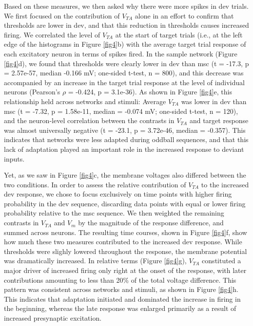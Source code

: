 \documentclass[pdflatex,referee,iicol,sn-basic]{sn-jnl}
\theoremstyle{thmstyleone}%
\theoremstyle{thmstyletwo}%
\theoremstyle{thmstylethree}%
\begin{document}
Based on these measures, we then asked why there were more spikes in dev trials. We first focused on the contribution of $V_{TA}$ alone in an effort to confirm that thresholds are lower in dev, and that this reduction in thresholds causes increased firing. We correlated the level of $V_{TA}$ at the start of target trials (i.e., at the left edge of the histograms in Figure \ref{fig4}b) with the average target trial response of each excitatory neuron in terms of spikes fired. In the sample network (Figure \ref{fig4}d), we found that thresholds were clearly lower in dev than msc (t = -17.3, p = 2.57e-57, median -0.166 mV; one-sided t-test, n = 800), and this decrease was accompanied by an increase in the target trial response at the level of individual neurons (Pearson's $\rho$ = -0.424, p = 3.1e-36). As shown in Figure \ref{fig4}e, this relationship held across networks and stimuli: Average $V_{TA}$ was lower in dev than msc (t = -7.32, p = 1.58e-11, median = -0.074 mV; one-sided t-test, n = 120), and the neuron-level correlation between the contrasts in $V_{TA}$ and target response was almost universally negative (t = -23.1, p = 3.72e-46, median = -0.357). This indicates that networks were less adapted during oddball sequences, and that this lack of adaptation played an important role in the increased response to deviant inputs.

Yet, as we saw in Figure \ref{fig4}c, the membrane voltages also differed between the two conditions. In order to assess the relative contribution of $V_{TA}$ to the increased dev response, we chose to focus exclusively on time points with higher firing probability in the dev sequence, discarding data points with equal or lower firing probability relative to the msc sequence. We then weighted the remaining contrasts in $V_{TA}$ and $V_m$ by the magnitude of the response difference, and summed across neurons. The resulting time courses, shown in Figure \ref{fig4}f, show how much these two measures contributed to the increased dev response. While thresholds were slighly lowered throughout the response, the membrane potential was dramatically increased. In relative terms (Figure \ref{fig4}g), $V_{TA}$ constituted a major driver of increased firing only right at the onset of the response, with later contributions amounting to less than 20\% of the total voltage difference. This pattern was consistent across networks and stimuli, as shown in Figure \ref{fig4}h. This indicates that adaptation initiated and dominated the increase in firing in the beginning, whereas the late response was enlarged primarily as a result of increased presynaptic excitation.
\end{document}
